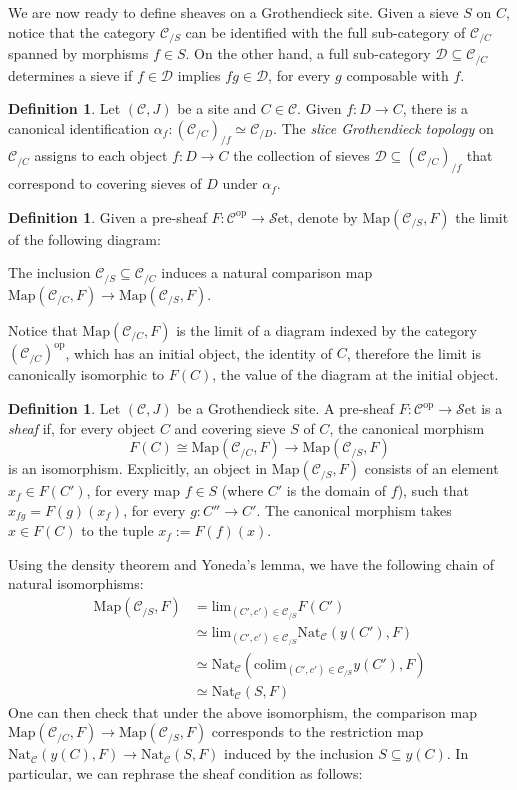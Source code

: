 \documentclass[10pt]{amsart}
\newcommand{\C}{\mathscr{C}}
\newcommand{\D}{\mathscr{D}}
\newcommand{\Map}{\mathrm{Map}}
\newcommand{\set}{\mathscr{S}\mathrm{et}}
\newcommand{\Nat}{\mathrm{Nat}}
\newcommand{\colim}{\mathrm{colim}}
\newcommand{\op}{\mathrm{op}}
\theoremstyle{definition}
\newtheorem{definition}[equation]{Definition}
\theoremstyle{remark}
\numberwithin{equation}{section}
\begin{document}
	We are now ready to define sheaves on a Grothendieck site. Given a sieve $S$ on $C$, notice that the category $\C_{/S}$ can be identified with the full sub-category of $\C_{/C}$ spanned by morphisms $f\in S$. On the other hand, a full sub-category $\D\subseteq\C_{/C}$ determines a sieve if $f\in\D$ implies $fg\in\D$, for every $g$ composable with $f$. 
	\begin{definition}\label{def:slicetop}
		Let $(\C,J)$ be a site and $C\in\C$. Given $f:D\to C$, there is a canonical identification $\alpha_f:(\C_{/C})_{/f}\simeq\C_{/D}$. The \emph{slice Grothendieck topology} on $\C_{/C}$ assigns to each object $f:D\to C$ the collection of sieves $\D\subseteq(\C_{/C})_{/f}$ that correspond to covering sieves of $D$ under $\alpha_f$. 
	\end{definition}
	\begin{definition}\label{map}
		Given a pre-sheaf $F\colon \C^{\op}\to\set$, denote by $\Map(\C_{/S},F)$ the limit of the following diagram:
	\begin{center}
	\end{center}The inclusion $\C_{/S}\subseteq\C_{/C}$ induces a natural \textnormal{comparison map} $\Map(\C_{/C},F)\to\Map(\C_{/S},F)$.
	\end{definition}
	 Notice that $\Map(\C_{/C},F)$ is the limit of a diagram indexed by the category $(\C_{/C})^{\op}$, which has an initial object, the identity of $C$, therefore the limit is canonically isomorphic to $F(C)$, the value of the diagram at the initial object.
	\begin{definition}
		Let $(\C, J)$ be a Grothendieck site. A {pre-sheaf} $F : \C^{\op} \to \set$ is a \emph{sheaf} if, for every object $C$ and covering sieve $S$ of $C$, the canonical morphism
		\[ F(C)\cong\Map(\C_{/C},F) \to \Map(\C_{/S},F)\]
		is an isomorphism. Explicitly, an object in $\Map(\C_{/S},F)$ consists of an element $x_f\in F(C')$, for every map $f\in S$ (where $C'$ is the domain of $f$), such that $x_{fg}=F(g)(x_f)$, for every $g\colon C''\to C'$. The canonical morphism takes $x\in F(C)$ to the tuple $x_f:=F(f)(x)$. 
	\end{definition}Using the density theorem and Yoneda's lemma, we have the following chain of natural isomorphisms:
	\begin{align*}
		\Map(\C_{/S},F) &= \textrm{lim}_{(C',c')\in\C_{/S}}F(C') \\
		&\simeq \textrm{lim}_{(C',c')\in\C_{/S}}\Nat_\C(y(C'),F) \\
		&\simeq \Nat_\C(\colim_{(C',c')\in\C_{/S}}y(C'),F)\\
		&\simeq \Nat_\C(S,F)
	\end{align*}One can then check that under the above isomorphism, the comparison map $\Map(\C_{/C},F)\to\Map(\C_{/S},F)$ corresponds to the restriction map $\Nat_\C(y(C),F)\to\Nat_\C(S,F)$ induced by the inclusion $S\subseteq y(C)$. In particular, we can rephrase the sheaf condition as follows:
\end{document}
